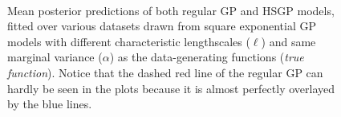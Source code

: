 \documentclass[onecolumn,a4paper,11pt]{article}
\begin{document}
\begin{figure}
\\
\vspace{-3mm}
\caption{Mean posterior predictions of both regular GP and HSGP models, fitted over various datasets drawn from square exponential GP models with different characteristic lengthscales ($\ell$) and same marginal variance ($\alpha$) as the data-generating functions (\textit{true function}). Notice that the dashed red line of the regular GP can hardly be seen in the plots because it is almost perfectly overlayed by the blue lines.}
  \label{fig7_posterior_varing_lscale_part1}
\end{figure}
\end{document}
